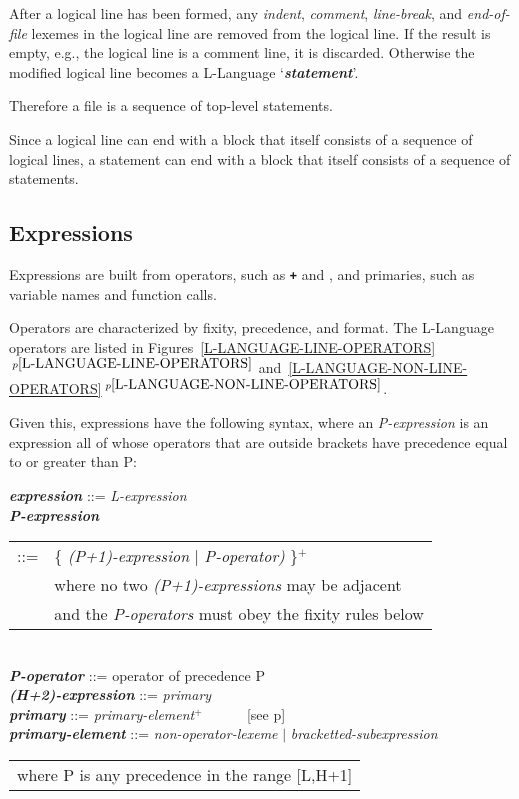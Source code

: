 \documentclass[12pt]{article}
\newcommand{\TT}[1]{{\tt \bfseries #1}}
\newcommand{\PLUS}[1][]{{$^{+#1}$}}
\newcommand{\emkey}[1]{{\em \bfseries #1}}
\newcommand{\itemref}[1]{\ref{#1}$\,^{p\pageref{#1}}$}
\newcommand{\pagref}[1]{p\pageref{#1}}
\newenvironment{indpar}[1][0.3in]%
	{\begin{list}{}%
		     {\setlength{\itemsep}{0in}%
		      \setlength{\topsep}{0in}%
		      \setlength{\parsep}{1ex}%
		      \setlength{\labelwidth}{#1}%
		      \setlength{\leftmargin}{#1}%
		      \addtolength{\leftmargin}{\labelsep}}%
	 \item}%
	{\end{list}}
\begin{document}
After a logical line
has been formed, any {\em indent},
{\em comment}, {\em line-break}, and {\em end-of-file}
lexemes in the logical line
are removed from the logical line.  If the result is
empty, e.g., the logical line is a comment line, it is discarded.
Otherwise the
modified logical line becomes a L-Language `\emkey{statement}'.

Therefore a file is a sequence of top-level statements.

Since a logical line can end with a block that itself consists
of a sequence of logical lines, a statement can end with
a block that itself consists of a sequence of statements.

\newpage

\subsection{Expressions}

Expressions are built from operators, such as \TT{+} and \TT{*},
and primaries, such as variable names and function calls.

Operators are characterized by fixity, precedence, and format.
The L-Language operators are listed in
Figures~\itemref{L-LANGUAGE-LINE-OPERATORS}
and~\itemref{L-LANGUAGE-NON-LINE-OPERATORS}.


Given this, expressions have the following syntax,
where an {\em P-expression}
is an expression all of whose operators that are outside brackets
have precedence equal to or greater than P:

\begin{indpar}\begin{minipage}{6in}
\emkey{expression}\label{EXPRESSION} ::= {\em L-expression}
\\[0.5ex]
\emkey{P-expression}
    \begin{tabular}[t]{@{}rl}
    ::= & \{ {\em (P+1)-expression} $|$ {\em P-operator)} \}\PLUS{} \\
        & where no two {\em (P+1)-expressions} may be adjacent \\ 
        & and the {\em P-operators} must obey the fixity rules below \\
    \end{tabular}
\\[0.5ex]
\emkey{P-operator} ::= operator of precedence P
\\[0.5ex]
\emkey{(H+2)-expression} ::= {\em primary}
\\[0.5ex]
\emkey{primary} ::= {\em primary-element}\PLUS{} ~~~~~ [see \pagref{PRIMARIES}]
\\[0.5ex]
\emkey{primary-element} ::= {\em non-operator-lexeme} $|$
                            {\em bracketted-subexpression}
\\[2.0ex]
\hspace*{3em}\begin{tabular}{l}
where P is any precedence in the range [L,H+1]
\end{tabular}
\end{minipage}\end{indpar}
\end{document}
